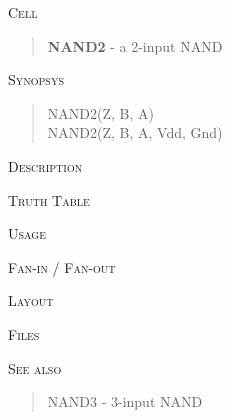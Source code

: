 
\textsc{Cell}
\begin{quote}
    \textbf{NAND2} - a 2-input NAND
\end{quote}

\textsc{Synopsys}
\begin{quote}
    NAND2(Z, B, A) \\
    NAND2(Z, B, A, Vdd, Gnd)
\end{quote}

\textsc{Description}



\textsc{Truth Table}


\textsc{Usage}

\textsc{Fan-in / Fan-out}

\textsc{Layout}

\textsc{Files}

\textsc{See also}
\begin{quote}
    NAND3 - 3-input NAND
\end{quote}

